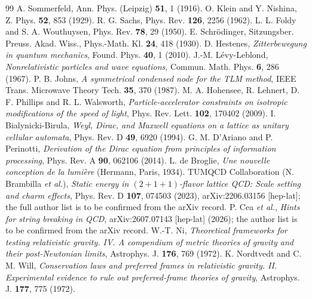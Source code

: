 \documentclass[11pt,a4paper]{article}
\theoremstyle{plain}
\theoremstyle{remark}
\begin{document}
\begin{thebibliography}{99}
 A. Sommerfeld, Ann. Phys. (Leipzig) \textbf{51}, 1 (1916).
 O. Klein and Y. Nishina, Z. Phys. \textbf{52}, 853 (1929).
 R. G. Sachs, Phys. Rev. \textbf{126}, 2256 (1962).
 L. L. Foldy and S. A. Wouthuysen, Phys. Rev. \textbf{78}, 29 (1950).
 E. Schr\"odinger, Sitzungsber. Preuss. Akad. Wiss., Phys.-Math. Kl. \textbf{24}, 418 (1930).
 D. Hestenes, \textit{Zitterbewegung in quantum mechanics}, Found. Phys. \textbf{40}, 1 (2010).
 J.-M. L\'evy-Leblond, \textit{Nonrelativistic particles and wave equations}, Commun. Math. Phys. \textbf{6}, 286 (1967).
 P. B. Johns, \textit{A symmetrical condensed node for the TLM method}, IEEE Trans. Microwave Theory Tech. \textbf{35}, 370 (1987).
 M. A. Hohensee, R. Lehnert, D. F. Phillips and R. L. Walsworth, \textit{Particle-accelerator constraints on isotropic modifications of the speed of light}, Phys. Rev. Lett. \textbf{102}, 170402 (2009).
 I. Bialynicki-Birula, \textit{Weyl, Dirac, and Maxwell equations on a lattice as unitary cellular automata}, Phys. Rev. D \textbf{49}, 6920 (1994).
 G. M. D'Ariano and P. Perinotti, \textit{Derivation of the Dirac equation from principles of information processing}, Phys. Rev. A \textbf{90}, 062106 (2014).
 L. de Broglie, \textit{Une nouvelle conception de la lumi\`ere} (Hermann, Paris, 1934).
 TUMQCD Collaboration (N. Brambilla \textit{et al.}), \textit{Static energy in $(2+1+1)$-flavor lattice QCD: Scale setting and charm effects}, Phys. Rev. D \textbf{107}, 074503 (2023), arXiv:2206.03156 [hep-lat]; the full author list is to be confirmed from the arXiv record.
 P. Cea \textit{et al.}, \textit{Hints for string breaking in QCD}, arXiv:2607.07143 [hep-lat] (2026); the author list is to be confirmed from the arXiv record.
 W.-T. Ni, \textit{Theoretical frameworks for testing relativistic gravity. IV. A compendium of metric theories of gravity and their post-Newtonian limits}, Astrophys. J. \textbf{176}, 769 (1972).
 K. Nordtvedt and C. M. Will, \textit{Conservation laws and preferred frames in relativistic gravity. II. Experimental evidence to rule out preferred-frame theories of gravity}, Astrophys. J. \textbf{177}, 775 (1972).
\end{thebibliography}
\end{document}
